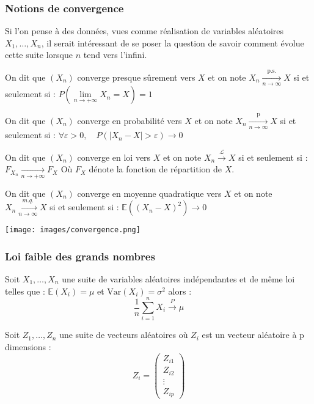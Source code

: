 \documentclass[
  letterpaper,
  DIV=11,
  numbers=noendperiod]{scrartcl}
\begin{document}
\newpage

\subsubsection{Notions de convergence}\label{notions-de-convergence}

Si l'on pense à des données, vues comme réalisation de variables
aléatoires \(X_1, \ldots, X_n\), il serait intéressant de se poser la
question de savoir comment évolue cette suite lorsque \(n\) tend vers
l'infini.

On dit que \((X_n)\) converge presque sûrement vers \(X\) et on note
\(X_n \underset{n \rightarrow \infty}{\xrightarrow{\text{p.s.}}}{} X\)
si et seulement si :
\(P\left(\underset{n\to+\infty}{\lim} X_n = X\right) = 1\)

On dit que \((X_n)\) converge en probabilité vers \(X\) et on note
\(X_n \underset{n \rightarrow \infty}{\xrightarrow{\text{p}}} X\) si et
seulement si :
\(\forall \varepsilon > 0, \quad P(|X_n - X| > \varepsilon) \rightarrow 0\)

On dit que \((X_n)\) converge en loi vers \(X\) et on note
\(X_n \xrightarrow{\mathcal{L}} X\) si et seulement si :
\(F_{X_n} \underset{n \to +\infty}{\rightarrow} F_X\) Où \(F_X\) dénote
la fonction de répartition de \(X\).

On dit que \((X_n)\) converge en moyenne quadratique vers \(X\) et on
note \(X_n \underset{n \rightarrow \infty}{\xrightarrow{m.q.}}X\) si et
seulement si : \(\mathbb{E}((X_n - X)^2) \rightarrow 0\)

\begin{center}
\texttt{[image: images/convergence.png]}
\end{center}

\subsubsection{Loi faible des grands
nombres}\label{loi-faible-des-grands-nombres}

Soit \(X_1, \ldots, X_n\) une suite de variables aléatoires
indépendantes et de même loi telles que : \(\mathbb{E}(X_i) = \mu\) et
\(\text{Var}(X_i) = \sigma^2\) alors :\\
\[\frac{1}{n} \sum_{i=1}^{n} X_i \xrightarrow{P} \mu \]

Soit \(Z_1,\ldots, Z_n\) une suite de vecteurs aléatoires où \(Z_i\) est
un vecteur aléatoire à p dimensions :
\[Z_i = \begin{pmatrix} Z_{i1} \\ Z_{i2} \\ \vdots \\ Z_{ip} \end{pmatrix}\]
\end{document}
